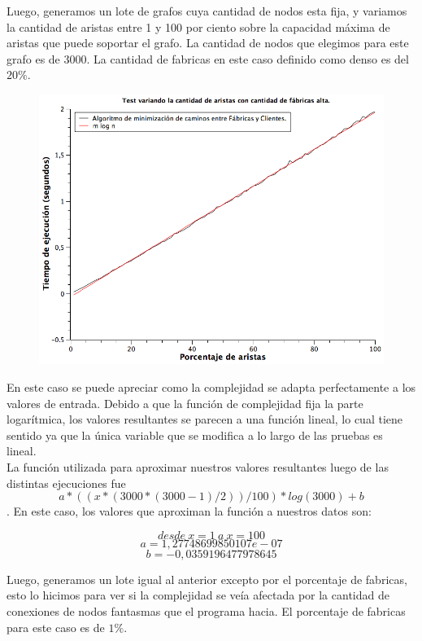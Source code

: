 \newpage
Luego, generamos un lote de grafos cuya cantidad de nodos esta fija, y variamos la cantidad de aristas entre 1 y 100 por ciento sobre la capacidad máxima de aristas que puede soportar el grafo. La cantidad de nodos que elegimos para este grafo es de $3000$. La cantidad de fabricas en este caso definido como denso es del $20\%$.

\begin{figure}[H]
	\includegraphics[width=350pt]{../tests/ej3/EJ3-r-var-denso.png}
\end{figure}

En este caso se puede apreciar como la complejidad se adapta perfectamente a los valores de entrada. Debido a que la función de complejidad fija la parte logarítmica, los valores resultantes se parecen a una función lineal, lo cual tiene sentido ya que la única variable que se modifica a lo largo de las pruebas es lineal.\\
La función utilizada para aproximar nuestros valores resultantes luego de las distintas ejecuciones fue $$a*((x*(3000*(3000-1)/2))/100)*log(3000)+b $$.
En este caso, los valores que aproximan la función a nuestros datos son:

$$desde\ x = 1\ a\ x = 100 $$
$$a  = 1,27748699850107e-07$$
$$b  = -0,0359196477978645 $$

\newpage
Luego, generamos un lote igual al anterior excepto por el porcentaje de fabricas, esto lo hicimos para ver si la complejidad se veía afectada por la cantidad de conexiones de nodos fantasmas que el programa hacia. El porcentaje de fabricas para este caso es de $1\%$.

